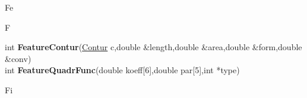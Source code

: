 \documentclass[10pt,titlepage]{article}
\def\functionlistentry#1#2#3#4#5#6{\noindent #1 {\bf #2}(#3) \dotfill #6\\}
\def\letterref#1{}
\def\letterlabel#1{\vspace{0.5cm}\centerline{\Large #1}}
\def\letterlabelend#1{}
\begin{document}
{{\letterlabel{Fe}
\letterlabel{F}
\letterref{A}
\letterref{B}
\letterref{C}
\letterref{D}
\letterref{E}
\letterref{F}
\letterref{G}
\letterref{H}
\letterref{I}
\letterref{K}
\letterref{L}
\letterref{M}
\letterref{N}
\letterref{O}
\letterref{P}
\letterref{Q}
\letterref{R}
\letterref{S}
\letterref{T}
\letterref{U}
\letterref{V}
\letterref{W}
\letterref{X}
\letterref{Y}
\letterref{Z}

\letterref{Fe}
\letterref{Fi}
\letterref{Fm}
\letterref{Fo}
\letterref{Fr}
\letterref{Fu}
\letterlabelend{Fe}
\functionlistentry{int}{FeatureContur}{\hyperlink{Contur}{Contur} c,double \&length,double \&area,double \&form,double \&conv}{430}{conturs}{}
\functionlistentry{int}{FeatureQuadrFunc}{double koeff[6],double par[5],int *type}{1381}{numeric}{}

\letterlabel{Fi}
\letterref{A}
\letterref{B}
\letterref{C}
\letterref{D}
\letterref{E}
\letterref{F}
\letterref{G}
\letterref{H}
\letterref{I}
\letterref{K}
\letterref{L}
\letterref{M}
\letterref{N}
\letterref{O}
\letterref{P}
\letterref{Q}
\letterref{R}
\letterref{S}
\letterref{T}
\letterref{U}
\letterref{V}
\letterref{W}
\letterref{X}
\letterref{Y}
\letterref{Z}

}}
\end{document}
